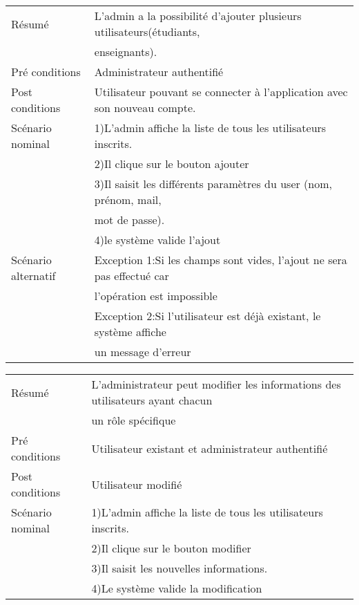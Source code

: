 \documentclass[a4paper,12pt,oneside]{report}
\begin{document}
\begin{center}

\begin{tabular}{|l|l|}
  \hline
  Résumé & L'admin a la possibilité d'ajouter plusieurs utilisateurs(étudiants, \\
  & enseignants). \\
  \hline
  Pré conditions & Administrateur authentifié  \\
  \hline
  Post conditions & Utilisateur pouvant se connecter à l'application avec son nouveau compte.\\
  \hline
 Scénario nominal & 1)L'admin affiche la liste de tous les utilisateurs inscrits. \\ 
 & 2)Il clique sur le bouton ajouter \\
 
& 3)Il saisit les différents paramètres du user (nom, prénom, mail,\\ & mot de passe). \\

& 4)le système valide l'ajout\\ \hline

Scénario alternatif & Exception 1:Si les champs sont vides, l'ajout ne sera pas effectué car \\ & l'opération est impossible\\ &  Exception 2:Si l'utilisateur est déjà existant, le système affiche \\ & un message d'erreur \\
\hline

\end{tabular}
\end{center}
\begin{center}
\begin{tabular}{|l|l|}
  \hline
  Résumé & L'administrateur peut modifier les informations 
des utilisateurs ayant chacun \\ & un rôle spécifique \\
  \hline
  Pré conditions & Utilisateur existant et administrateur authentifié \\
  \hline
  Post conditions & Utilisateur modifié\\
  \hline
 Scénario nominal & 1)L'admin affiche la liste de tous les utilisateurs inscrits. \\ 
 & 2)Il clique sur le bouton modifier \\
 
& 3)Il saisit les nouvelles informations. \\
& 4)Le système valide la modification\\
 \hline

\end{tabular}
\end{center}
\end{document}
